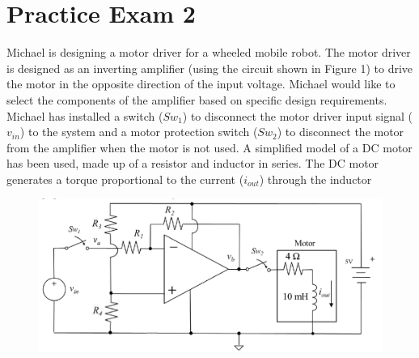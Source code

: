\chapter{Practice Exam 2}
    Michael is designing a motor driver for a wheeled mobile robot. The motor driver is designed as
    an inverting amplifier (using the circuit shown in Figure 1) to drive the motor in the opposite
    direction of the input voltage. Michael would like to select the components of the amplifier
    based on specific design requirements. Michael has installed a switch ($Sw_1$) to disconnect the
    motor driver input signal ($v_{in}$) to the system and a motor protection switch ($Sw_2$) to disconnect
    the motor from the amplifier when the motor is not used. A simplified model of a DC motor has
    been used, made up of a resistor and inductor in series. The DC motor generates a torque
    proportional to the current ($i_{out}$) through the inductor
    \begin{figure}[H]
        \centering
        \includegraphics[width=0.6\linewidth]{figures/exams/motor_amp.png}
    \end{figure}
